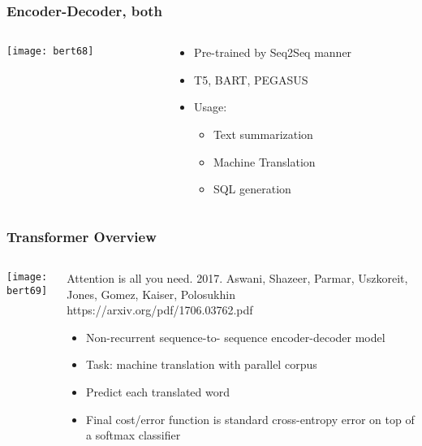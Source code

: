 \begin{frame}[fragile]\frametitle{Encoder-Decoder, both}

\begin{columns}
    \begin{column}[T]{0.5\linewidth}
			\begin{center}
			\texttt{[image: bert68]}
			\end{center}		
		\end{column}
    \begin{column}[T]{0.5\linewidth}
      \begin{itemize}
			\item Pre-trained by Seq2Seq manner
			\item T5, BART, PEGASUS
			\item Usage:
      \begin{itemize}
			\item Text summarization
			\item Machine Translation
			\item SQL generation
			\end{itemize}
			\end{itemize}
    \end{column}
  \end{columns}
			
\end{frame}

\begin{frame}[fragile]\frametitle{Transformer Overview}

\begin{columns}
    \begin{column}[T]{0.5\linewidth}
			\begin{center}
			\texttt{[image: bert69]}
			\end{center}		
		\end{column}
    \begin{column}[T]{0.5\linewidth}
		Attention is all you need. 2017.  Aswani, Shazeer, Parmar, Uszkoreit,  Jones, Gomez, Kaiser, Polosukhin  https://arxiv.org/pdf/1706.03762.pdf 

      \begin{itemize}
			\item Non-recurrent sequence-to-  sequence encoder-decoder model
			\item Task: machine translation  with parallel corpus
			\item Predict each translated word
			\item Final cost/error function is  standard cross-entropy error on top of a softmax classifier
			\end{itemize}
    \end{column}
  \end{columns}
			
\end{frame}

